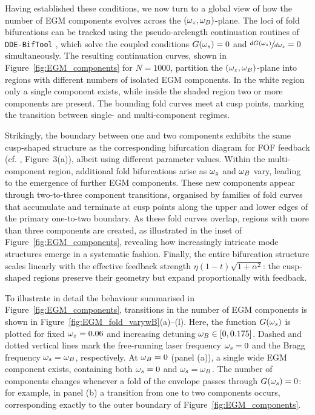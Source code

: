 %
\par
%
Having established these conditions, we now turn to a global view of how the number of EGM components evolves across the $(\omega_z,\omega_B)$-plane.
The loci of fold bifurcations can be tracked using the pseudo-arclength continuation routines of \texttt{DDE-BifTool} \cite{sieber2014dde}, which solve the coupled conditions $G(\omega_s)=0$ and $\sfrac{dG(\omega_s)}{d\omega_s}=0$ simultaneously.
The resulting continuation curves, shown in Figure~\ref{fig:EGM_components} for $N=1000$, partition the $(\omega_z,\omega_B)$-plane into regions with different numbers of isolated EGM components.
In the white region only a single component exists, while inside the shaded region two or more components are present.
The bounding fold curves meet at cusp points, marking the transition between single- and multi-component regimes.
%
\par
%
Strikingly, the boundary between one and two components exhibits the same cusp-shaped structure as the corresponding bifurcation diagram for FOF feedback (cf. \cite{green2006mode}, Figure~3(a)), albeit using different parameter values.
Within the multi-component region, additional fold bifurcations arise as $\omega_z$ and $\omega_B$ vary, leading to the emergence of further EGM components.
These new components appear through two-to-three component transitions, organised by families of fold curves that accumulate and terminate at cusp points along the upper and lower edges of the primary one-to-two boundary.
As these fold curves overlap, regions with more than three components are created, as illustrated in the inset of Figure~\ref{fig:EGM_components}, revealing how increasingly intricate mode structures emerge in a systematic fashion.
Finally, the entire bifurcation structure scales linearly with the effective feedback strength $\eta (1-t)\sqrt{1+\alpha^2}$: the cusp-shaped regions preserve their geometry but expand proportionally with feedback.
%
\par
%
To illustrate in detail the behaviour summarised in Figure~\ref{fig:EGM_components}, transitions in the number of EGM components is shown in Figure~\ref{fig:EGM_fold_varywB}(a)--(l).
Here, the function $G(\omega_s)$ is plotted for fixed $\omega_z=0.06$ and increasing detuning $\omega_B \in [0,0.175]$.
Dashed and dotted vertical lines mark the free-running laser frequency $\omega_s=0$ and the Bragg frequency $\omega_s=\omega_B$, respectively.
At $\omega_B=0$ (panel (a)), a single wide EGM component exists, containing both $\omega_s=0$ and $\omega_s=\omega_B$.
The number of components changes whenever a fold of the envelope passes through $G(\omega_s)=0$: for example, in panel (b) a transition from one to two components occurs, corresponding exactly to the outer boundary of Figure~\ref{fig:EGM_components}.
